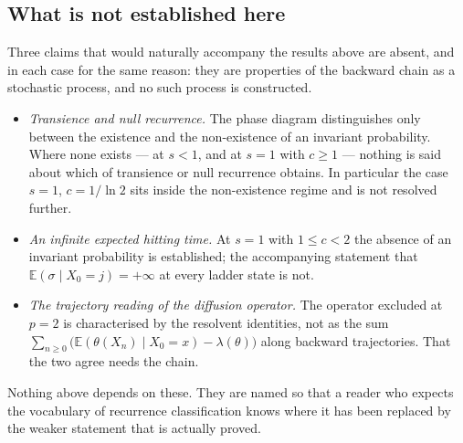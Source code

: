 \subsection{What is not established here}\label{sec:doubling_differences}

Three claims that would naturally accompany the results above are absent, and in each case for
the same reason: they are properties of the backward chain as a stochastic process, and no such
process is constructed.

\begin{itemize}
  \item \emph{Transience and null recurrence.} The phase diagram distinguishes only between the
        existence and the non-existence of an invariant probability. Where none exists --- at
        $s<1$, and at $s=1$ with $c\geq1$ --- nothing is said about which of transience or null
        recurrence obtains. In particular the case $s=1$, $c=1/\ln2$ sits inside the
        non-existence regime and is not resolved further.
  \item \emph{An infinite expected hitting time.} At $s=1$ with $1\leq c<2$ the absence of an
        invariant probability is established; the accompanying statement that
        $\mathbb E(\sigma\mid X_0=j)=+\infty$ at every ladder state is not.
  \item \emph{The trajectory reading of the diffusion operator.} The operator excluded at $p=2$
        is characterised by the resolvent identities, not as the sum
        $\sum_{n\geq0}\bigl(\mathbb E(\theta(X_n)\mid X_0=x)-\lambda(\theta)\bigr)$ along
        backward trajectories. That the two agree needs the chain.
\end{itemize}

\noindent
Nothing above depends on these. They are named so that a reader who expects the vocabulary of
recurrence classification knows where it has been replaced by the weaker statement that is
actually proved.

